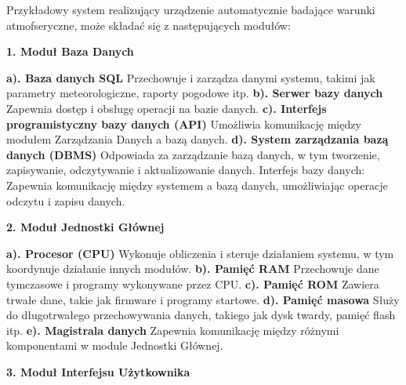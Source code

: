 \documentclass{article}
\begin{document}
\begin{center}
    \large Przykładowy system realizujący urządzenie automatycznie badające warunki atmofseryczne, może składać się z następujących modułów: \newline \newline
    \begin{center}
        \textbf{1. Moduł Baza Danych} 
    \end{center}
    \begin{flushleft}
        \textbf{a). Baza danych SQL} Przechowuje i zarządza danymi systemu, takimi jak parametry meteorologiczne, raporty pogodowe itp. \newline
        \textbf{b). Serwer bazy danych} Zapewnia dostęp i obsługę operacji na bazie danych. \newline
        \textbf{c). Interfejs programistyczny bazy danych (API)} Umożliwia komunikację między modułem Zarządzania Danych a bazą danych. \newline
        \textbf{d). System zarządzania bazą danych (DBMS)} Odpowiada za zarządzanie bazą danych, w tym tworzenie, zapisywanie, odczytywanie i aktualizowanie danych.
        Interfejs bazy danych: Zapewnia komunikację między systemem a bazą danych, umożliwiając operacje odczytu i zapisu danych. \newline
    \end{flushleft}
\end{center}
\large
\begin{center}
    \textbf{2. Moduł Jednostki Głównej} 
\end{center}
\begin{flushleft}
    \textbf{a). Procesor (CPU)} Wykonuje obliczenia i steruje działaniem systemu, w tym koordynuje działanie innych modułów. \newline
    \textbf{b). Pamięć RAM} Przechowuje dane tymczasowe i programy wykonywane przez CPU. \newline
    \textbf{c). Pamięć ROM} Zawiera trwałe dane, takie jak firmware i programy startowe. \newline
    \textbf{d). Pamięć masowa} Służy do długotrwałego przechowywania danych, takiego jak dysk twardy, pamięć flash itp. \newline
    \textbf{e). Magistrala danych} Zapewnia komunikację między różnymi komponentami w module Jednostki Głównej. \newline
\end{flushleft}
\large
\begin{center}
    \textbf{3. Moduł Interfejsu Użytkownika} 
\end{center}
\end{document}
